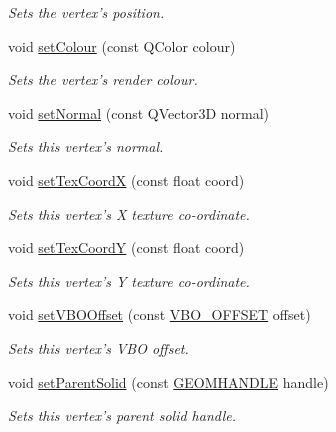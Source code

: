 \begin{DoxyCompactItemize}
\begin{DoxyCompactList}\small\item\em Sets the vertex's position. \end{DoxyCompactList}\item 
void \hyperlink{class_vertex3_d_ac922ca7c683657d60be4147d17d2d74e}{set\-Colour} (const Q\-Color colour)
\begin{DoxyCompactList}\small\item\em Sets the vertex's render colour. \end{DoxyCompactList}\item 
void \hyperlink{class_vertex3_d_a512576966b5a70493353df7f3571e727}{set\-Normal} (const Q\-Vector3\-D normal)
\begin{DoxyCompactList}\small\item\em Sets this vertex's normal. \end{DoxyCompactList}\item 
void \hyperlink{class_vertex3_d_a8fba559b69d9ba907d962c7154321854}{set\-Tex\-Coord\-X} (const float coord)
\begin{DoxyCompactList}\small\item\em Sets this vertex's X texture co-\/ordinate. \end{DoxyCompactList}\item 
void \hyperlink{class_vertex3_d_a72cc82c3b015c4aabd5a2223933655b5}{set\-Tex\-Coord\-Y} (const float coord)
\begin{DoxyCompactList}\small\item\em Sets this vertex's Y texture co-\/ordinate. \end{DoxyCompactList}\item 
void \hyperlink{class_vertex3_d_a8201535f83d869bb1421e7d36962624a}{set\-V\-B\-O\-Offset} (const \hyperlink{vertex_8h_a2e2e1374aac5842116c8683f3b06e99f}{V\-B\-O\-\_\-\-O\-F\-F\-S\-E\-T} offset)
\begin{DoxyCompactList}\small\item\em Sets this vertex's V\-B\-O offset. \end{DoxyCompactList}\item 
void \hyperlink{class_vertex3_d_aec0f45cdc6b03ec560fd4c352c6bd694}{set\-Parent\-Solid} (const \hyperlink{vertex_8h_a72202e57358ed73cd212e9a2eaf39aeb}{G\-E\-O\-M\-H\-A\-N\-D\-L\-E} handle)
\begin{DoxyCompactList}\small\item\em Sets this vertex's parent solid handle. \end{DoxyCompactList}\item 

\end{DoxyCompactItemize}
